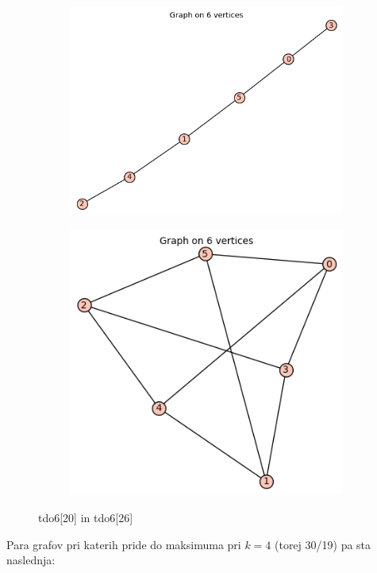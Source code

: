 \documentclass[12pt, a4paper]{article}
\begin{document}
\begin{center}
\begin{figure}[!htb]
\centering
\begin{subfigure}{0.5\textwidth}
  \centering
  \includegraphics[width=0.5\linewidth]{tdo6[20]}
\end{subfigure}%
\begin{subfigure}{0.5\textwidth}
  \centering
  \includegraphics[width=0.47\linewidth]{tdo6[26]}
\end{subfigure}
\caption{tdo6[20] in tdo6[26]}
\label{fig:test}
\end{figure}

\end{center}
Para grafov pri katerih pride do maksimuma pri $k=4$ (torej 30/19) pa sta naslednja:
\end{document}
